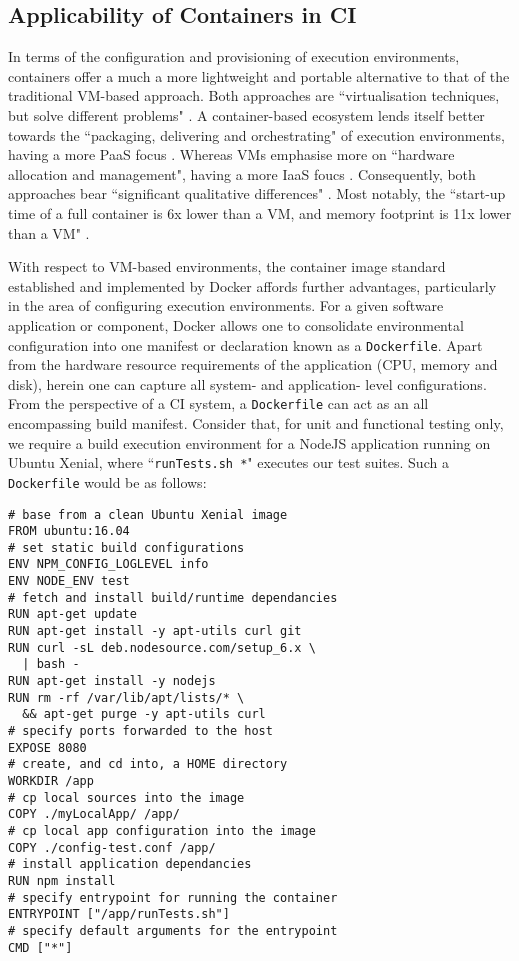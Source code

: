 \documentclass[journal]{IEEEtran}
\begin{document}
\subsection{Applicability of Containers in CI}
In terms of the configuration and provisioning of execution environments, containers  
offer a much a more lightweight and portable alternative to that of the traditional VM-based approach.
Both approaches are ``virtualisation
techniques, but solve different problems" \citep{Claus}. A container-based ecosystem lends itself better 
towards the ``packaging, delivering and orchestrating" of execution environments, having
a more PaaS focus \citep{Claus}. Whereas VMs emphasise more on ``hardware allocation and management",
having a more IaaS foucs \citep{Claus}. Consequently, both approaches bear
``significant qualitative differences" \citep{Agarwal}. Most notably, the ``start-up time of a full container is 6x lower than a
VM, and memory footprint is 11x lower than a VM" \citep{Agarwal}.
\par
With respect to VM-based environments, the container image standard established and implemented by Docker affords 
further advantages, particularly in the area of configuring execution environments.   
For a given software application or component, Docker allows
one to consolidate environmental configuration
into one manifest or declaration known as a \texttt{Dockerfile}. 
Apart from the hardware resource requirements of the application (CPU, memory and disk), 
herein one can capture all system- and application- level configurations. 
From the perspective of a CI system, a  \texttt{Dockerfile} can
act as an all encompassing build manifest. Consider that, 
for unit and functional testing only, we require a build execution environment
for a NodeJS application running on Ubuntu Xenial, where ``\texttt{runTests.sh *}" executes our test suites.
Such a \texttt{Dockerfile} would be as follows:
\begin{verbatim}
# base from a clean Ubuntu Xenial image
FROM ubuntu:16.04
# set static build configurations
ENV NPM_CONFIG_LOGLEVEL info
ENV NODE_ENV test
# fetch and install build/runtime dependancies
RUN apt-get update
RUN apt-get install -y apt-utils curl git
RUN curl -sL deb.nodesource.com/setup_6.x \
  | bash -
RUN apt-get install -y nodejs 
RUN rm -rf /var/lib/apt/lists/* \
  && apt-get purge -y apt-utils curl
# specify ports forwarded to the host
EXPOSE 8080
# create, and cd into, a HOME directory
WORKDIR /app
# cp local sources into the image
COPY ./myLocalApp/ /app/
# cp local app configuration into the image
COPY ./config-test.conf /app/
# install application dependancies
RUN npm install
# specify entrypoint for running the container 
ENTRYPOINT ["/app/runTests.sh"]
# specify default arguments for the entrypoint
CMD ["*"]
\end{verbatim}
\end{document}
